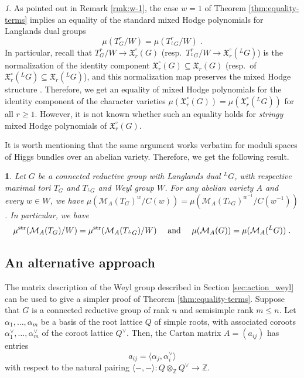 \documentclass[11pt,english]{amsart}
\numberwithin{equation}{section}
\numberwithin{figure}{section}
\theoremstyle{plain}
\newtheorem{cor}[thm]{\protect\corollaryname}
\theoremstyle{plain}
\theoremstyle{definition}
\theoremstyle{remark}
\newtheorem{rem}[thm]{\protect\remarkname}
\newcommand{\ZZ}{\mathbb{Z}}
\newcommand{\str}{\textup{str}}
\providecommand{\corollaryname}{Corollary}
\providecommand{\remarkname}{Remark}
\begin{document}
\begin{rem}
    As pointed out in Remark \ref{rmk:w-1}, the case $w = 1$ of Theorem \ref{thm:equality-terms} implies an equality of the standard mixed Hodge polynomials for Langlands dual groups 
    $$
        \mu(T^r_G/W) = \mu(T^r_{^LG}/W)\; .
    $$
    In particular, recall that $T^r_G/W \to {\mathfrak{X}}^\circ_r(G)$ (resp.\ $T^r_{^LG}/W \to {\mathfrak{X}}^\circ_r(^LG)$) is the normalization of the identity component ${\mathfrak{X}}^\circ_r(G) \subseteq \mathfrak{X}_r(G)$ (resp.\ of ${\mathfrak{X}}^\circ_r(^LG) \subseteq \mathfrak{X}_r(^LG)$), and this normalization map preserves the mixed Hodge structure \cite[Section 5.1]{FS}. Therefore, we get an equality of mixed Hodge polynomials for the identity component of the character varieties $\mu({\mathfrak{X}}^\circ_r(G)) = \mu({\mathfrak{X}}^\circ_r(^LG))$ for all $r \geq 1$. However, it is not known whether such an equality holds for \emph{stringy} mixed Hodge polynomials of ${\mathfrak{X}}^\circ_r(G)$.
\end{rem}

It is worth mentioning that the same argument works verbatim for moduli spaces of Higgs bundles over an abelian variety. Therefore, we get the following result.

\begin{cor}\label{cor:mirror-symmetry-Higgs}
Let $G$ be a connected reductive group with Langlands dual $^LG$, with respective maximal tori $T_G$ and $T_{^LG}$ and Weyl group $W$. For any abelian variety $A$ and every $w \in W$, we have $
        \mu(\mathcal{M}_{A}(T_G)^w/C(w)) = \mu(\mathcal{M}_{A}(T_{^LG})^{w^{-1}}/C(w^{-1}))$.
In particular, we have
$$
\mu^{\str}(\mathcal{M}_{A}(T_G)/W)= \mu^{\str}(\mathcal{M}_{A}(T_{^LG})/W) \quad \textrm{ and } \quad \mu(\mathcal{M}_{A}(G))= \mu(\mathcal{M}_{A}(^LG))\; .
$$
\end{cor}

\subsection*{An alternative approach}
    The matrix description of the Weyl group described in Section \ref{sec:action_weyl} can be used to give a simpler proof of Theorem \ref{thm:equality-terms}. Suppose that $G$ is a connected reductive group of rank $n$ and semisimple rank $m \leq n$. Let $\alpha_1, \ldots, \alpha_m$ be a basis of the root lattice $Q$ of simple roots, with associated coroots $\alpha_1^\vee, \ldots, \alpha_m^\vee$ of the coroot lattice $Q^\vee$. Then, the Cartan matrix $A = (a_{ij})$ has entries
    $$
        a_{ij} = \langle \alpha_j, \alpha_i^\vee\rangle
    $$
    with respect to the natural pairing $\langle - , -\rangle: Q \otimes_\ZZ Q^\vee \to \ZZ$.
\end{document}
